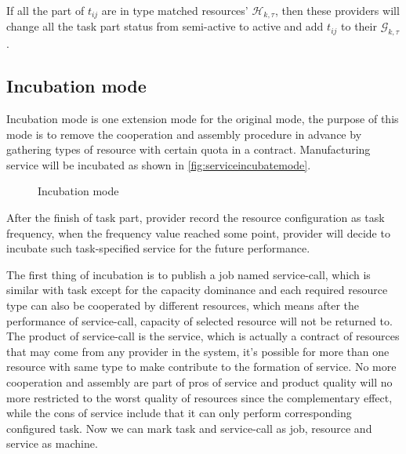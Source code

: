 If all the part of $t_{ij}$ are in type matched resources' $\mathcal{H}_{k,\tau}$, then these providers will change all the task part status from semi-active to active and add $t_{ij}$ to their $\mathcal{G}_{k,\tau}$.

\subsection{Incubation mode} %
\label{sub:incubation_mode}
Incubation mode is one extension mode for the original mode, the purpose of this mode is to remove the cooperation and assembly procedure in advance by gathering types of resource with certain quota in a contract. Manufacturing service will be incubated as shown in \autoref{fig:serviceincubatemode}.  
\begin{figure}[htbp]
    \centering
    \resizebox{0.7\textwidth}{!}{}
    \caption{Incubation mode}
    \label{fig:serviceincubatemode}
\end{figure}
After the finish of task part, provider record the resource configuration as task frequency, when the frequency value reached some point, provider will decide to incubate such task-specified service for the future performance.

The first thing of incubation is to publish a job named service-call, which is similar with task except for the capacity dominance and each required resource type can also be cooperated by different resources, which means after the performance of service-call, capacity of selected resource will not be returned to. The product of service-call is the service, which is actually a contract of resources that may come from any provider in the system, it's possible for more than one resource with same type to make contribute to the formation of service. No more cooperation and assembly are part of pros of service and product quality will no more restricted to the worst quality of resources since the complementary effect, while the cons of service include that it can only perform  corresponding configured task.
Now we can mark task and service-call as job, resource and service as machine.

